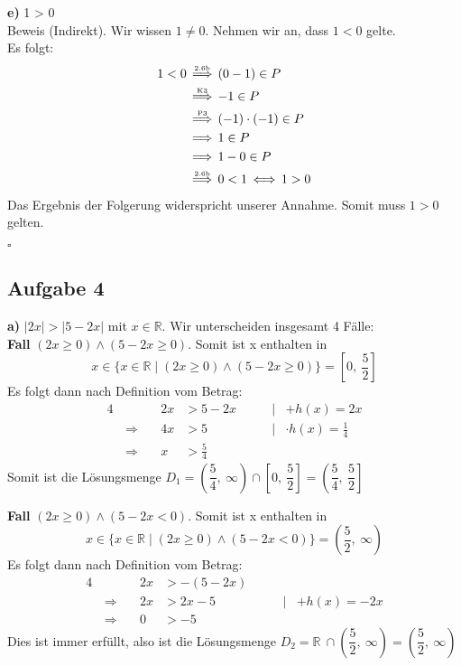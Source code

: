 \documentclass[a4paper,graphics,12pt]{article}
\newcommand{\aufgabe}[1]{\subsection*{Aufgabe #1}}
\newcommand{\up}[2]{\mathrel{\overset{\makebox[0pt]{\mbox{\normalfont\tiny #2}}}{#1}}}
\begin{document}
\textbf{e)} 1 > 0\\[5pt]
Beweis (Indirekt). Wir wissen $1 \neq 0$. Nehmen wir an, dass $1<0$ gelte.\\
Es folgt:
\begin{align*}
    1<0 &\up{\,\Longrightarrow\,}{2.6b} (0-1) \in P\\
    &\up{\,\Longrightarrow\,}{K3} -1 \in P\\
    &\up{\,\Longrightarrow\,}{P3} (-1)\cdot (-1) \in P\\
    &\up{\,\Longrightarrow\,}{} 1 \in P\\
    &\up{\,\Longrightarrow\,}{} 1-0 \in P\\
    &\up{\,\Longrightarrow\,}{2.6b} 0 < 1 \,\Longleftrightarrow\, 1 > 0
\end{align*}
Das Ergebnis der Folgerung widerspricht unserer Annahme. Somit muss $1 > 0$ gelten.\\
\strut\hfill$\square$

%
\newpage
\aufgabe{4}
\textbf{a)} $\vert 2x\vert > \vert 5-2x\vert$ mit $x \in \mathbb{R}$.
Wir unterscheiden insgesamt 4 Fälle:\\[5pt]
\textbf{Fall} $(2x \geq 0) \land (5-2x \geq 0)$.
Somit ist x enthalten in
$$
    x \in \{x \in \mathbb{R} \mid (2x \geq 0) \land (5-2x \geq 0)\}
    = \left[0,\ \dfrac{5}{2}\right]
$$
Es folgt dann nach Definition vom Betrag:
\begin{alignat*}{4}
    &                       &2x &> 5-2x\qquad   &|& +h(x)=2x \\[1pt]
    &\,\Longrightarrow\quad &4x &> 5            &|& \cdot h(x)=\frac{1}{4} \\[1pt]
    &\,\Longrightarrow      &x &> \frac{5}{4}   &&
\end{alignat*}
Somit ist die Lösungsmenge
$
    D_1 = \left(\dfrac{5}{4},\ \infty\right) \cap \left[0,\ \dfrac{5}{2}\right]
        = \left(\dfrac{5}{4},\ \dfrac{5}{2}\right]
$

\textbf{Fall} $(2x \geq 0) \land (5-2x < 0)$.
Somit ist x enthalten in
$$
    x\in \{x \in \mathbb{R} \mid (2x \geq 0) \land (5-2x <0)\}
    = \left(\dfrac{5}{2},\ \infty\right)
$$
Es folgt dann nach Definition vom Betrag:
\begin{alignat*}{4}
    &                       &2x &> -(5-2x)\qquad   && \\[1pt]
    &\,\Longrightarrow\quad &2x &> 2x-5            &|& +h(x)=-2x \\[1pt]
    &\,\Longrightarrow\quad &0 &> -5     &&
\end{alignat*}
Dies ist immer erfüllt, also ist die Lösungsmenge
$
    D_2 = \mathbb{R}\ \cap \left(\dfrac{5}{2},\ \infty\right)
        = \left(\dfrac{5}{2},\ \infty\right)
$\\
\end{document}
